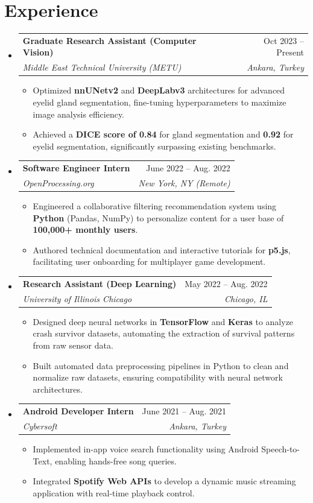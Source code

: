 \documentclass[letterpaper,11pt]{article}
\makeatletter
\newcommand{\resumeItem}[1]{
  \item\small{
    {#1 \vspace{-2pt}}
  }
}
\newcommand{\resumeSubheading}[4]{
  \vspace{-2pt}\item
    \begin{tabular*}{0.97\textwidth}[t]{l@{\extracolsep{\fill}}r}
      \textbf{#1} & #2 \\
      \textit{\small#3} & \textit{\small #4} \\
    \end{tabular*}\vspace{-7pt}
}
\newcommand{\resumeSubHeadingListStart}{\begin{itemize}[leftmargin=0.15in, label={}]}
\newcommand{\resumeSubHeadingListEnd}{\end{itemize}}
\newcommand{\resumeItemListStart}{\begin{itemize}}
\newcommand{\resumeItemListEnd}{\end{itemize}\vspace{-5pt}}
\makeatother
\begin{document}
\section{Experience}
  \resumeSubHeadingListStart

    \resumeSubheading
      {Graduate Research Assistant (Computer Vision)}{Oct 2023 -- Present}
      {Middle East Technical University (METU)}{Ankara, Turkey}
      \resumeItemListStart
        \resumeItem{Optimized \textbf{nnUNetv2} and \textbf{DeepLabv3} architectures for advanced eyelid gland segmentation, fine-tuning hyperparameters to maximize image analysis efficiency.}
        \resumeItem{Achieved a \textbf{DICE score of 0.84} for gland segmentation and \textbf{0.92} for eyelid segmentation, significantly surpassing existing benchmarks.}
      \resumeItemListEnd

    \resumeSubheading
      {Software Engineer Intern}{June 2022 -- Aug. 2022}
      {OpenProcessing.org}{New York, NY (Remote)}
      \resumeItemListStart
        \resumeItem{Engineered a collaborative filtering recommendation system using \textbf{Python} (Pandas, NumPy) to personalize content for a user base of \textbf{100,000+ monthly users}.}
        \resumeItem{Authored technical documentation and interactive tutorials for \textbf{p5.js}, facilitating user onboarding for multiplayer game development.}
      \resumeItemListEnd

    \resumeSubheading
      {Research Assistant (Deep Learning)}{May 2022 -- Aug. 2022}
      {University of Illinois Chicago}{Chicago, IL}
      \resumeItemListStart
        \resumeItem{Designed deep neural networks in \textbf{TensorFlow} and \textbf{Keras} to analyze crash survivor datasets, automating the extraction of survival patterns from raw sensor data.}
        \resumeItem{Built automated data preprocessing pipelines in Python to clean and normalize raw datasets, ensuring compatibility with neural network architectures.}
      \resumeItemListEnd

    \resumeSubheading
      {Android Developer Intern}{June 2021 -- Aug. 2021}
      {Cybersoft}{Ankara, Turkey}
      \resumeItemListStart
        \resumeItem{Implemented in-app voice search functionality using Android Speech-to-Text, enabling hands-free song queries.}
        \resumeItem{Integrated \textbf{Spotify Web APIs} to develop a dynamic music streaming application with real-time playback control.}
      \resumeItemListEnd

  \resumeSubHeadingListEnd
\end{document}
